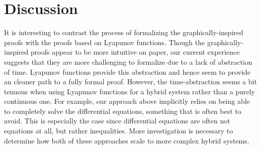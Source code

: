 \documentclass[preprint,nocopyrightspace]{sigplanconf}
\begin{document}
\vspace{-0.2cm}
\section {Discussion}
It is interesting to contrast the process of formalizing the graphically-inspired proofs with the proofs based on Lyapunov functions.
Though the graphically-inspired proofs appear to be more intuitive on paper, our current experience suggests that they are more challenging to formalize due to a lack of abstraction of time.
Lyapunov functions provide this abstraction and hence seem to provide an cleaner path to a fully formal proof.
However, the time-abstraction seems a bit tenuous when using Lyapunov functions for a hybrid system rather than a purely continuous one.
For example, our approach above implicitly relies on being able to completely solve the differential equations, something that is often best to avoid.
This is especially the case since differential equations are often not equations at all, but rather inequalities.
More investigation is necessary to determine how both of these approaches scale to more complex hybrid systems.








\end{document}
